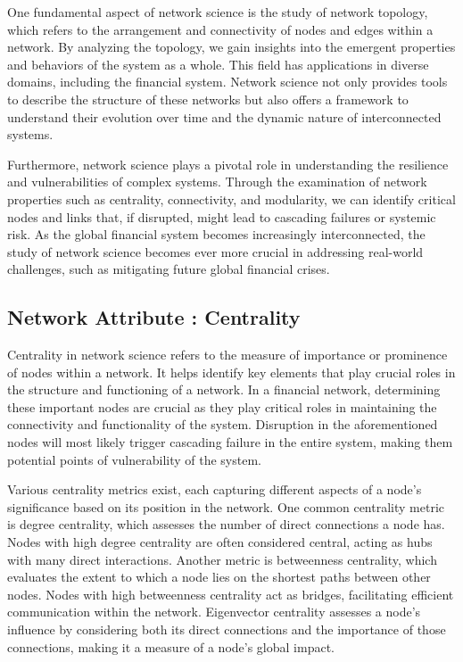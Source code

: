 \documentclass[a4paper,11pt]{article}
\begin{document}
One fundamental aspect of network science is the study of network topology, which refers to the arrangement and connectivity of nodes and edges within a network. By analyzing the topology, we gain insights into the emergent properties and behaviors of the system as a whole. This field has applications in diverse domains, including the financial system. Network science not only provides tools to describe the structure of these networks but also offers a framework to understand their evolution over time and the dynamic nature of interconnected systems.

Furthermore, network science plays a pivotal role in understanding the resilience and vulnerabilities of complex systems. Through the examination of network properties such as centrality, connectivity, and modularity, we can identify critical nodes and links that, if disrupted, might lead to cascading failures or systemic risk. As the global financial system becomes increasingly interconnected, the study of network science becomes ever more crucial in addressing real-world challenges, such as mitigating future global financial crises.

\subsection{Network Attribute : Centrality}
Centrality in network science refers to the measure of importance or prominence of nodes within a network. It helps identify key elements that play crucial roles in the structure and functioning of a network. In a financial network, determining these important nodes are crucial as they play critical roles in maintaining the connectivity and functionality of the system. Disruption in the aforementioned nodes will most likely trigger cascading failure in the entire system, making them potential points of vulnerability of the system.

Various centrality metrics exist, each capturing different aspects of a node's significance based on its position in the network. One common centrality metric is degree centrality, which assesses the number of direct connections a node has. Nodes with high degree centrality are often considered central, acting as hubs with many direct interactions. Another metric is betweenness centrality, which evaluates the extent to which a node lies on the shortest paths between other nodes. Nodes with high betweenness centrality act as bridges, facilitating efficient communication within the network. Eigenvector centrality assesses a node's influence by considering both its direct connections and the importance of those connections, making it a measure of a node's global impact.
\end{document}
